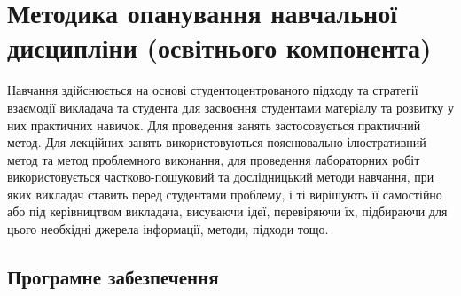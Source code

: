 \documentclass{Syllabus}
\begin{document}

\printbibliography[category=LabPract, heading=subbibliography, title={Лабораторний практикум}]



\section{Методика опанування навчальної дисципліни (освітнього компонента)}

Навчання здійснюється на основі студентоцентрованого підходу та стратегії взаємодії викладача та студента для засвоєння студентами матеріалу та розвитку у них практичних навичок. Для проведення занять застосовується практичний метод. Для лекційних занять використовуються пояснювально-ілюстративний метод та метод проблемного виконання, для проведення лабораторних робіт використовується частково-пошуковий та дослідницький методи навчання, при яких викладач ставить перед студентами проблему, і ті вирішують її самостійно або під керівництвом викладача, висуваючи ідеї, перевіряючи їх, підбираючи для цього необхідні джерела інформації, методи, підходи тощо.


\subsection*{Програмне забезпечення}
\end{document}
